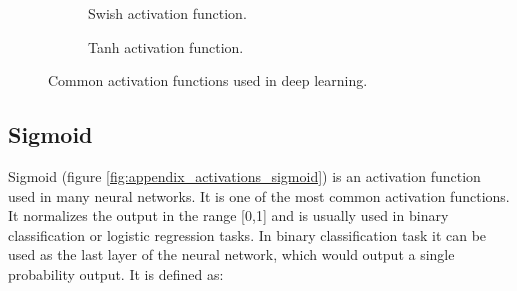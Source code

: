 \begin{figure*}
\begin{subfigure}[b]{0.4\textwidth}
        \centering 
        \caption[]%
        {{\small Swish activation function.}}    
        \label{fig:appendix_activations_swish}
    \end{subfigure}
    \hfill
    \begin{subfigure}[b]{0.4\textwidth}   
        \centering 
        \caption[]%
        {{\small Tanh activation function.}}    
        \label{fig:appendix_activations_tanh}
    \end{subfigure}
    \caption []%
    {\small Common activation functions used in deep learning.} 
\end{figure*}







\subsection*{Sigmoid}

Sigmoid (figure \ref{fig:appendix_activations_sigmoid}) is an activation function used in many neural networks. It is one of the most common activation functions. It normalizes the output in the range [0,1] and is usually used in binary classification or logistic regression tasks. In binary classification task it can be used as the last layer of the neural network, which would output a single probability output. It is defined as:

